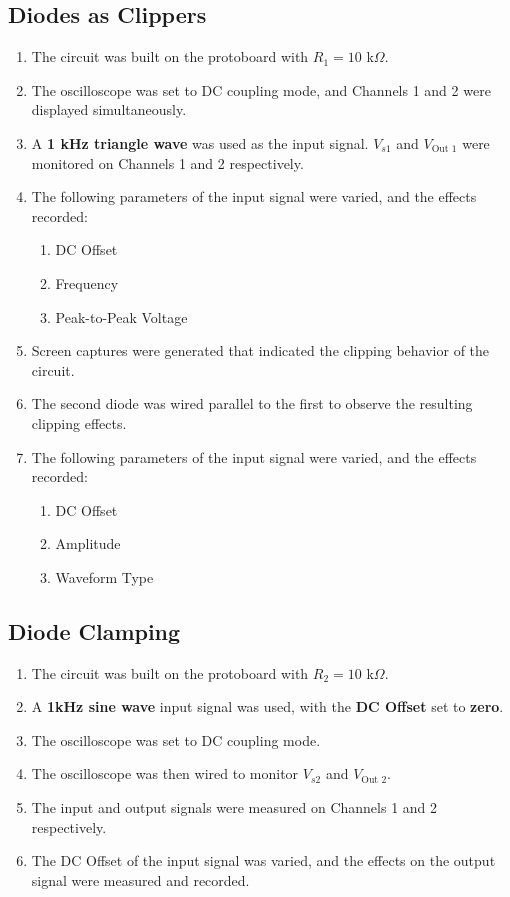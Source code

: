 \documentclass[twocolumn,english]{IEEEtran}
\begin{document}
\subsection{Diodes as Clippers}
  \begin{enumerate}
    \item The circuit was built on the protoboard with $R_1=10$ k$\Omega$. %
    \item The oscilloscope was set to DC coupling mode, and Channels 1 and 2 were displayed simultaneously.
    \item A \textbf{1 kHz triangle wave} was used as the input signal. $V_{s1}$ and $V_{\text{Out 1}}$ were monitored on Channels 1 and 2 respectively.
    \item The following parameters of the input signal were varied, and the effects recorded:
      \begin{enumerate}
       \item DC Offset
       \item Frequency
       \item Peak-to-Peak Voltage
      \end{enumerate}
    \item Screen captures were generated that indicated the clipping behavior of the circuit.
    \item The second diode was wired parallel to the first to observe the resulting clipping effects. %
    \item The following parameters of the input signal were varied, and the effects recorded:
      \begin{enumerate}
       \item DC Offset
       \item Amplitude
       \item Waveform Type
      \end{enumerate}
  \end{enumerate}

\subsection{Diode Clamping}
  \begin{enumerate}
   \item The circuit was built on the protoboard with $R_2 = 10$ k$\Omega$. %
   \item A \textbf{1kHz sine wave} input signal was used, with the \textbf{DC Offset} set to \textbf{zero}.
   \item The oscilloscope was set to DC coupling mode. %
   \item The oscilloscope was then wired to monitor $V_{s2}$ and $V_{\text{Out 2}}$.
   \item The input and output signals were measured on Channels 1 and 2 respectively. %
   \item The DC Offset of the input signal was varied, and the effects on the output signal were measured and recorded.
  \end{enumerate}
\end{document}

